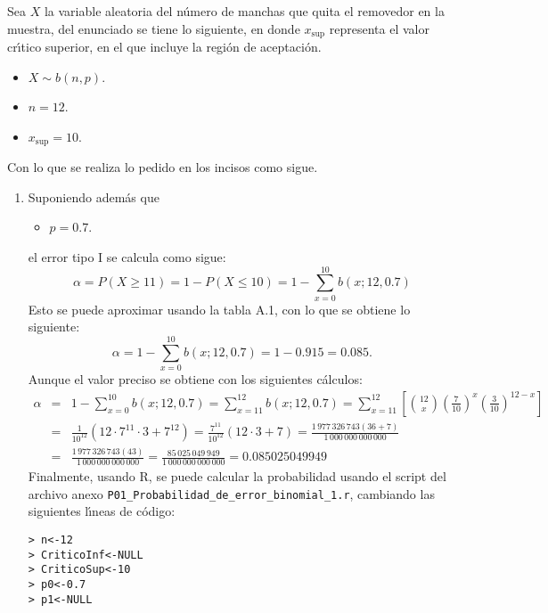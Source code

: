 \begin{solucion}
 Sea $X$ la variable aleatoria del n\'umero de manchas que quita el removedor en la muestra, del enunciado se tiene lo siguiente, en donde $x_{\text{sup}}$ representa el valor cr\'{\i}tico superior, en el que incluye la regi\'on de aceptaci\'on.
 \begin{itemize}
  \item $X \sim b(n,p)$.
  \item $n = 12$.
  \item $x_{\text{sup}} = 10$.
 \end{itemize}
 Con lo que se realiza lo pedido en los incisos como sigue.
 \begin{enumerate}
  \item Suponiendo adem\'as que
  \begin{itemize}
   \item $p = 0.7$.
  \end{itemize}
  el error tipo I se calcula como sigue:
  \begin{equation*}
   \alpha = P(X \geq 11) = 1 - P(X \leq 10) = 1 - \sum_{x=0}^{10} b(x;12,0.7)
  \end{equation*}
  Esto se puede aproximar usando la tabla A.1, con lo que se obtiene lo siguiente:
  \begin{equation*}
   \alpha = 1 - \sum_{x=0}^{10} b(x;12,0.7) = 1 - 0.915 = 0.085.
  \end{equation*}
  Aunque el valor preciso se obtiene con los siguientes c\'alculos:
  \begin{eqnarray*}
   \alpha & = & 1 - \sum_{x=0}^{10} b(x;12,0.7) = \sum_{x=11}^{12} b(x;12,0.7) = \sum_{x=11}^{12} \left[ \binom{12}{x} \left( \frac{7}{10} \right)^x \left( \frac{3}{10} \right)^{12-x} \right] \\
   & = & \frac{1}{10^{12}}\left( 12\cdot 7^{11} \cdot 3 + 7^{12} \right) = \frac{7^{11}}{10^{12}}(12 \cdot 3 + 7) = \frac{1\,977\,326\,743(36+7)}{1\,000\,000\,000\,000} \\
   & = & \frac{1\,977\,326\,743(43)}{1\,000\,000\,000\,000} = \frac{85\,025\,049\,949}{1\,000\,000\,000\,000} = 0.085025049949
  \end{eqnarray*}
  Finalmente, usando R, se puede calcular la probabilidad usando el script del archivo anexo \texttt{P01\_Probabilidad\_de\_error\_binomial\_1.r}, cambiando las siguientes l\'{\i}neas de c\'odigo:
  \begin{verbatim}
> n<-12
> CriticoInf<-NULL
> CriticoSup<-10
> p0<-0.7
> p1<-NULL
  \end{verbatim}

\end{enumerate}
\end{solucion}
